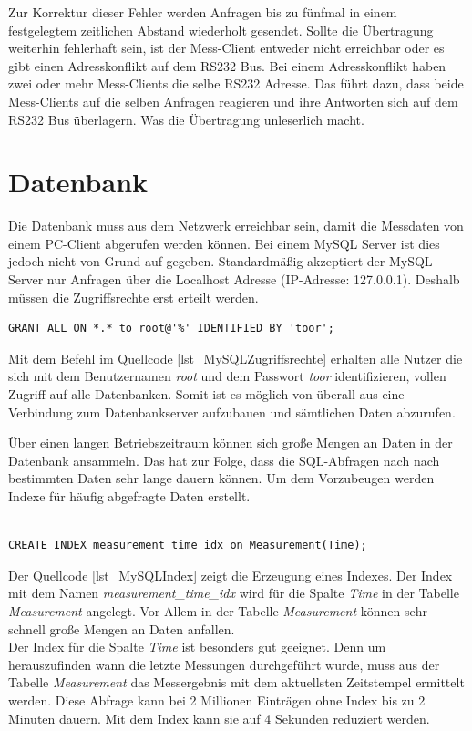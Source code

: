 Zur Korrektur dieser Fehler werden Anfragen bis zu fünfmal in einem festgelegtem zeitlichen Abstand wiederholt gesendet. Sollte die Übertragung weiterhin fehlerhaft sein, ist der Mess-Client entweder nicht erreichbar oder es gibt einen Adresskonflikt auf dem RS232 Bus. Bei einem Adresskonflikt haben zwei oder mehr Mess-Clients die selbe RS232 Adresse. Das führt dazu, dass beide Mess-Clients auf die selben Anfragen reagieren und ihre Antworten sich auf dem RS232 Bus überlagern. Was die Übertragung unleserlich macht.




\section{Datenbank}

Die Datenbank muss aus dem Netzwerk erreichbar sein, damit die Messdaten von einem PC-Client abgerufen werden können. Bei einem MySQL Server ist dies jedoch nicht von Grund auf gegeben. Standardmäßig akzeptiert der MySQL Server nur Anfragen über die Localhost Adresse (IP-Adresse: 127.0.0.1). Deshalb müssen die Zugriffsrechte erst erteilt werden.\\

\begin{lstlisting}[caption={MySQL Zugriffsrechte},label=lst_MySQLZugriffsrechte]
GRANT ALL ON *.* to root@'%' IDENTIFIED BY 'toor';
\end{lstlisting}

Mit dem Befehl im Quellcode \ref{lst_MySQLZugriffsrechte} erhalten alle Nutzer die sich mit dem Benutzernamen \textit{root} und dem Passwort \textit{toor} identifizieren, vollen Zugriff auf alle Datenbanken. Somit ist es möglich von überall aus eine Verbindung zum Datenbankserver aufzubauen und sämtlichen Daten abzurufen.\ 

Über einen langen Betriebszeitraum können sich große Mengen an Daten in der Datenbank ansammeln. Das hat zur Folge, dass die SQL-Abfragen nach nach bestimmten Daten sehr lange dauern können. Um dem Vorzubeugen werden Indexe für häufig abgefragte Daten erstellt.\\

\begin{lstlisting}[caption={MySQL Index},label=lst_MySQLIndex]

CREATE INDEX measurement_time_idx on Measurement(Time);

\end{lstlisting}


Der Quellcode \ref{lst_MySQLIndex} zeigt die Erzeugung eines Indexes. Der Index mit dem Namen \textit{measurement\_time\_idx} wird für die Spalte \textit{Time} in der Tabelle \textit{Measurement} angelegt. Vor Allem in der Tabelle \textit{Measurement} können sehr schnell große Mengen an Daten anfallen.\\
Der Index für die Spalte \textit{Time} ist besonders gut geeignet. Denn um herauszufinden wann die letzte Messungen durchgeführt wurde, muss aus der Tabelle \textit{Measurement} das Messergebnis mit dem aktuellsten Zeitstempel ermittelt werden. Diese Abfrage kann bei 2 Millionen Einträgen ohne Index bis zu  2 Minuten dauern. Mit dem Index kann sie auf 4 Sekunden reduziert werden.\ 

